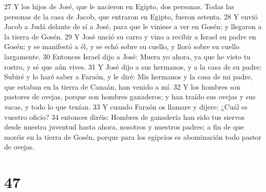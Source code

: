 27 Y los hijos de José, que le nacieron en Egipto, dos personas. Todas las personas de la casa de Jacob, que entraron en Egipto, fueron setenta.
28 Y envió Jacob a Judá delante de sí a José, para que le viniese a ver en Gosén; y llegaron a la tierra de Gosén.
29 Y José unció su carro y vino a recibir a Israel su padre en Gosén; y se manifestó a él, y se echó sobre su cuello, y lloró sobre su cuello largamente.
30 Entonces Israel dijo a José: Muera yo ahora, ya que he visto tu rostro, y sé que aún vives.
31 Y José dijo a sus hermanos, y a la casa de su padre: Subiré y lo haré saber a Faraón, y le diré: Mis hermanos y la casa de mi padre, que estaban en la tierra de Canaán, han venido a mí.
32 Y los hombres son pastores de ovejas, porque son hombres ganaderos; y han traído sus ovejas y sus vacas, y todo lo que tenían.
33 Y cuando Faraón os llamare y dijere: ¿Cuál es vuestro oficio?
34 entonces diréis: Hombres de ganadería han sido tus siervos desde nuestra juventud hasta ahora, nosotros y nuestros padres; a fin de que moréis en la tierra de Gosén, porque para los egipcios es abominación todo pastor de ovejas.

\chapter{47}

